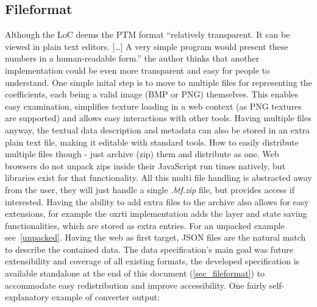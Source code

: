 \subsection{Fileformat}
Although the LoC deems the PTM format ``relatively transparent. It can be viewed
in plain text editors. [\ldots] A very simple program would present these
numbers in a human-readable
form.''\cite*{library_of_congress_polynomial_2018} the author thinks that
another implementation could be even more transparent and easy for people to
understand. One simple inital step is to move to multiple files for representing
the coefficients, each being a valid image (BMP or PNG) themselves. This enables easy examination, simplifies texture loading in a web context (as PNG
textures are supported) and allows easy interactions with other tools. Having
multiple files anyway, the textual data description and metadata can also be
stored in an extra plain text file, making it editable with standard tools. How
to easily distribute multiple files though - just archive (zip) them and distribute as
one. Web browsers do not unpack zips inside their JavaScript run times natively,
but libraries\cite*{noauthor_jszip_nodate} exist for that functionality. All
this multi file handling is abstracted away from the user, they will just handle a
single \emph{.btf.zip} file, but provides access if interested. Having the
ability to add extra files to the archive also allows for easy extensions, for
example the oxrti implementation adds the layer and state saving functionalities, which are stored
as extra entries. For an unpacked example see~\autoref{unpacked}. Having the web
as first target, JSON files are the natural match to describe the contained
data. The data specification's main goal was future extensibility and  coverage
of all existing formats, the developed specification is available standalone at the end of this document
(\autoref{sec_fileformat}) to accommodate easy redistribution and improve
accessibility. One fairly self-explanatory example of converter output:
